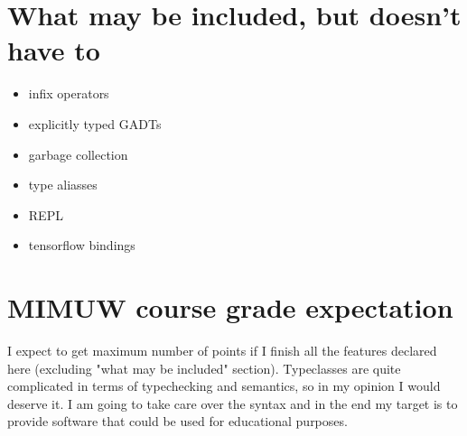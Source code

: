 \documentclass[11pt]{article}
\begin{document}
\section{What may be included, but doesn't have to}
\label{sec:orgb8f59e1}

\begin{itemize}
\item infix operators
\item explicitly typed GADTs
\item garbage collection
\item type aliasses
\item REPL
\item tensorflow bindings
\end{itemize}

\section{MIMUW course grade expectation}
\label{sec:org367b2a5}

I expect to get maximum number of points if I finish all the features declared here (excluding "what may be included" section). Typeclasses are quite complicated in terms of typechecking and semantics, so in my opinion I would deserve it. I am going to take care over the syntax and in the end my target is to provide software that could be used for educational purposes.
\end{document}
